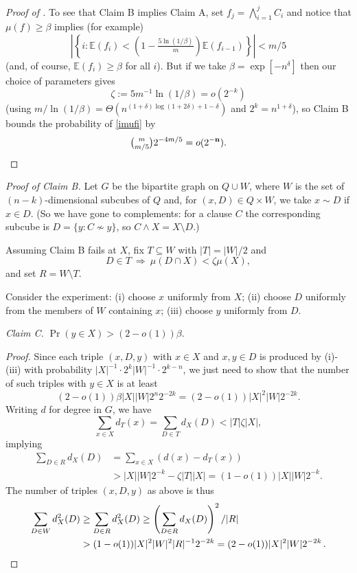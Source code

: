 \documentclass{toc}
\newcommand{\nn}[0]{{\bf n}}
\newcommand{\beq}[1]{\begin{equation}\label{#1}}
\newcommand{\enq}[0]{\end{equation}}
\newcommand{\mn}[0]{\medskip\noindent}
\newcommand{\sub}[0]{\subseteq}
\newcommand{\sm}[0]{\setminus}
\newcommand{\Ra}[0]{\Rightarrow}
\newcommand{\TTT}[0]{R}
\newcommand{\SSS}[0]{T}
\newcommand{\0}[0]{\emptyset}
\newcommand{\Cc}[0]{\tbinom}
\newcommand{\gb}[0]{\beta }
\newcommand{\gd}[0]{\delta }
\newcommand{\gz}[0]{\zeta}
\begin{document}
\begin{proof}[Proof of ]
\medskip
To see that Claim B implies Claim A,
set $f_j=\bigwedge_{i=1}^jC_i$ and notice that $\mu(f) \geq \gb$
implies (for example)
\beq{imufi}
%
%
\left|\left\{i: \mathbb E (f_i) <\left(1-\tfrac{5\ln(1/\gb)}{m}\right)
\mathbb E (f_{i-1})\right\}\right| < m/5
%
\enq
(and, of course, $\mathbb E (f_i)\geq \gb$ for all $i$).
But if we take
$\gb =\exp[-n^{\gd}]$ then our choice of parameters gives
$$\gz:=5m^{-1}\ln(1/\gb) =o(2^{-k})$$
(using $m/\ln (1/\gb) =
\Theta(n^{(1+\gd)\log (1+2\gd)+1-\gd})$ and
$2^k = n^{1+\gd}$),
so Claim B bounds the probability of \eqref{imufi} by
%
\begin{equation*}
\Cc{m}{m/5} 2^{-4m/5} =o(2^{-\nn}).   \qedhere    %
\end{equation*}
%
\end{proof}   %

\mn
\emph{Proof of Claim B.}
Let $G$ be the bipartite graph on
$Q\cup W$, where $W$ is the set of $(n-k)$-dimensional
subcubes of $Q$ and, for $(x,D)\in Q\times W$,
we take $x\sim D$ if $x\in D$.
(So %
we have  %
gone to complements:  for a clause $C$
the corresponding subcube is $D=\{y:C\not\sim y\}$,
so $C\wedge X =X\sm D$.)

Assuming Claim B fails at $X$, fix $\SSS \sub W$ with $|\SSS |=|W|/2$ and
$$D\in \SSS
  ~\Ra ~\mu (D\cap X) < \gz\mu(X),$$
and set $\TTT =W\sm \SSS $.

%
Consider the experiment:  %
(i) choose $x$ uniformly from $X$;
(ii)  choose $D$ uniformly from the members of $W$ containing $x$;
(iii)  choose $y$ uniformly from $D$.


\mn
\emph{Claim C.}  $\Pr(y\in X)> (2-o(1))\gb$.


\mn
\begin{proof}   %
%
Since each triple $(x,D,y)$ with $x\in X$ and $x,y\in D$ is
produced by (i)-(iii) with probability
$|X|^{-1}\cdot 2^k|W|^{-1}\cdot 2^{k-n}$,
we just need to show that the number of such triples with
$y\in X$ is at least
$$
(2-o(1))\gb |X||W|2^n2^{-2k}  = (2-o(1))|X|^2|W|2^{-2k}.
$$
Writing $d$ for degree in $G$, we have
$$
\sum_{x\in X}d_\SSS(x) =\sum_{D\in \SSS }d_X(D) < |\SSS |\gz
 |X|,
$$
implying
%
\begin{align*}
\sum_{D\in \TTT }d_X(D)& = 
\sum_{x\in X}(d(x)-d_\SSS (x))\\
&> |X||W|2^{-k} - \gz |\SSS ||X| = (1-o(1))|X||W|2^{-k}.
\end{align*}   %
The number of %
triples $(x,D,y)$  %
as above is thus
%
\begin{align*}
\sum_{D\in W} d_X^2(D)
&\geq
\sum_{D\in \TTT } d_X^2(D)
\geq
\left(\sum_{D\in \TTT } d_X(D)\right)^2/|\TTT |\\   %
&> (1-o(1))|X|^2|W|^2|\TTT |^{-1}2^{-2k}
= (2-o(1))|X|^2|W|2^{-2k}\,.
 \qedhere                          
\end{align*}   %
%
\end{proof}   %
\end{document}
